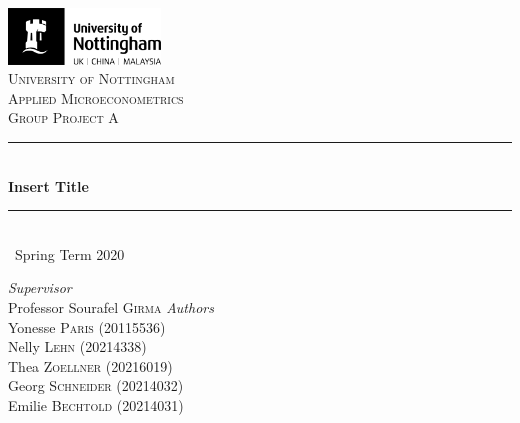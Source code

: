 \documentclass[a4paper,11pt]{scrartcl}
\newcommand{\sectionnumbering}[1]{%
  \setcounter{section}{0}%
   \renewcommand{\thesection}{\csname #1\endcsname{section}}}
\begin{document}
	\begin{titlepage}
		\newcommand{\HRule}{\rule{\linewidth}{0.5mm}}
		
	\vfill\vfill
	\includegraphics[height=1.5cm]{UoN_Logo}\\[1cm] 


	\center			
	\textsc{\LARGE University of Nottingham}\\[1.5cm] 
	\textsc{\Large Applied Microeconometrics}\\[0.5cm] 	
	\textsc{\large Group Project A}\\[0.5cm] 
	
	\HRule\\[0.4cm]
	{\huge\bfseries Insert Title}\\[0.4cm] 
	\HRule\\[0.4cm]
	
	{\large\ Spring Term 2020} 	
	\vfill\vfill\vfill 		
	
\begin{flushleft}
			\large
			\textit{Supervisor}\\
			Professor Sourafel \textsc{Girma} 
			\vfill\vfill 
			\textit{Authors}\\
			Yonesse \textsc{Paris} (20115536)\\
			Nelly  \textsc{Lehn} (20214338)\\
			Thea  \textsc{Zoellner} (20216019)\\
			Georg  \textsc{Schneider} (20214032)\\
			Emilie \textsc{Bechtold} (20214031)
		\end{flushleft}
	\vfill 
	
\end{titlepage}


\sectionnumbering{Roman}
\tableofcontents

\newpage

\listoftables
\newpage

\sectionnumbering{arabic}
\end{document}

